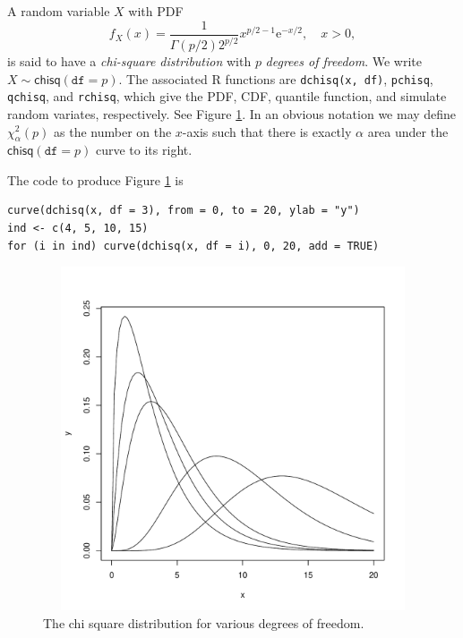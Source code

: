 \documentclass[captions=tableheading]{scrbook}
\begin{document}
A random variable \(X\) with PDF
\begin{equation}
f_{X}(x)=\frac{1}{\Gamma(p/2)2^{p/2}}x^{p/2-1}\mathrm{e}^{-x/2},\quad x>0,
\end{equation}
is said to have a \emph{chi-square distribution} with \(p\) \emph{degrees of freedom}. We write \(X\sim\mathsf{chisq}(\mathtt{df}=p)\). The associated \textsf{R} functions are \texttt{dchisq(x, df)}, \texttt{pchisq}, \texttt{qchisq}, and \texttt{rchisq}, which give the PDF, CDF, quantile function, and simulate random variates, respectively. See Figure \ref{fig:chisq-dist-vary-df}. In an obvious notation we may define \(\chi_{\alpha}^{2}(p)\) as the number on the \(x\)-axis such that there is exactly \(\alpha\) area under the \(\mathsf{chisq}(\mathtt{df}=p)\) curve to its right.

The code to produce Figure \ref{fig:chisq-dist-vary-df} is


\begin{verbatim}
curve(dchisq(x, df = 3), from = 0, to = 20, ylab = "y")
ind <- c(4, 5, 10, 15)
for (i in ind) curve(dchisq(x, df = i), 0, 20, add = TRUE)
\end{verbatim}



\begin{figure}[th]
    \includegraphics[width=5in, height=4in]{img/chisq-dist-vary-df.pdf}
    \caption[Chi square distribution for various degrees of freedom]{\small The chi square distribution for various degrees of freedom.}
    \label{fig:chisq-dist-vary-df}
  \end{figure}
\end{document}
